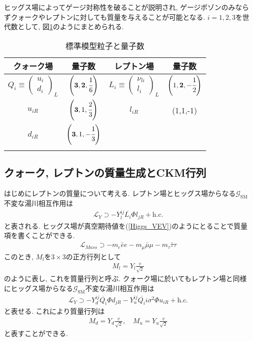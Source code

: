 ヒッグス場によってゲージ対称性を破ることが説明され, ゲージボゾンのみならずクォークやレプトンに対しても質量を与えることが可能となる.
$i=1,2,3$を世代数として, 図\ref{fig_sm}のようにまとめられる.
\begin{table}[ht]
  \caption{標準模型粒子と量子数}
  \begin{center}
    \begin{tabular}{cc|cc}\hline
  クォーク場& 量子数 & レプトン場 & 量子数 \\\hline\hline
  $Q_i\equiv\begin{pmatrix}
    u_i \\
    d_i
  \end{pmatrix}_{L}$
 & $\left(\bm{3}, \bm{2}, \cfrac{1}{6}\right)$ &  $L_i\equiv\begin{pmatrix}
    \nu_{li} \\
    l_i
  \end{pmatrix}_{L}$ & $\left(1,\bm{2},-\cfrac{1}{2}\right)$ \\
  $u_{iR}$ & $\left(\bm{3},1,\cfrac{2}{3}\right)$ & $l_{iR}$ & (1,1,-1) \\
  $d_{iR}$ & $\left(\bm{3},1,-\cfrac{1}{3}\right)$ & & \\\hline
  \label{fig_sm}
    \end{tabular}
  \end{center}
\end{table}
\subsection{クォーク, レプトンの質量生成とCKM行列}
はじめにレプトンの質量について考える.
レプトン場とヒッグス場からなる$\mathcal{G}_{\mathrm{SM}}$不変な湯川相互作用は
\begin{align}
  \mathcal{L}_Y \supset -Y_{l}^{ij} \overline{L_i}\Phi l_{jR} +\mathrm{h.c.}
\end{align}
と表される.
ヒッグス場が真空期待値を(\ref{Higgs_VEV})のようにとることで質量項を書くことができる.
\begin{align}
  \mathcal{L}_{Mass} \supset -m_e\bar{e}e -m_\mu \bar{\mu} \mu - m_\tau \bar{\tau}\tau\nonumber
\end{align}
このとき, $M_l$を$3\times 3$の正方行列として
\begin{align}
  M_l = Y_l\frac{v}{\sqrt{2}} \label{Mass_M_l}
\end{align}
のように表し, これを質量行列と呼ぶ.
クォーク場に於いてもレプトン場と同様にヒッグス場からなる$\mathcal{G}_{\mathrm{SM}}$不変な湯川相互作用は
\begin{align}
  \mathcal{L}_Y \supset -Y_{d}^{ij} \overline{Q_i}\Phi d_{jR} -Y_{u}^{ij} \overline{Q_i}i\sigma^2\Phi u_{iR} +\mathrm{h.c.}
\end{align}
と表せる.
これにより質量行列は
\begin{align}
  M_d = Y_d\frac{v}{\sqrt{2}},\quad M_u = Y_u \frac{v}{\sqrt{2}}\label{Mass_M_q}
\end{align}
と表すことができる.

